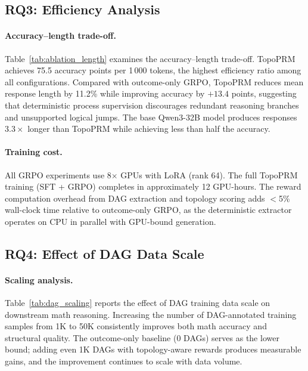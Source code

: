 \subsection{RQ3: Efficiency Analysis}
\label{sec:rq3}



\paragraph{Accuracy--length trade-off.}
Table~\ref{tab:ablation_length} examines the accuracy--length trade-off.
TopoPRM achieves 75.5 accuracy points per 1\,000 tokens, the highest efficiency ratio among all configurations.
Compared with outcome-only GRPO, TopoPRM reduces mean response length by 11.2\% while improving accuracy by $+13.4$ points, suggesting that deterministic process supervision discourages redundant reasoning branches and unsupported logical jumps.
The base Qwen3-32B model produces responses $3.3\times$ longer than TopoPRM while achieving less than half the accuracy.

\paragraph{Training cost.}
All GRPO experiments use 8$\times$ GPUs with LoRA (rank 64).
The full TopoPRM training (SFT + GRPO) completes in approximately 12 GPU-hours.
The reward computation overhead from DAG extraction and topology scoring adds $<$5\% wall-clock time relative to outcome-only GRPO, as the deterministic extractor operates on CPU in parallel with GPU-bound generation.

\subsection{RQ4: Effect of DAG Data Scale}
\label{sec:rq4_scaling}



\paragraph{Scaling analysis.}
Table~\ref{tab:dag_scaling} reports the effect of DAG training data scale on downstream math reasoning.
Increasing the number of DAG-annotated training samples from 1K to 50K consistently improves both math accuracy and structural quality.
The outcome-only baseline (0 DAGs) serves as the lower bound; adding even 1K DAGs with topology-aware rewards produces measurable gains, and the improvement continues to scale with data volume.

